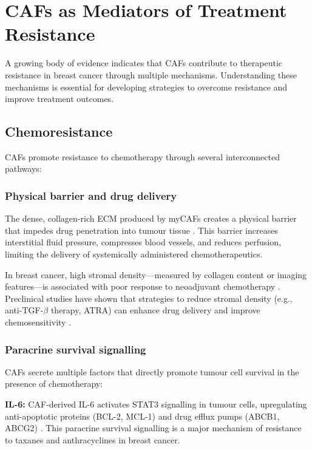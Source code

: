 \section{CAFs as Mediators of Treatment Resistance}
\label{sec:resistance}

A growing body of evidence indicates that CAFs contribute to therapeutic resistance in breast cancer through multiple mechanisms. Understanding these mechanisms is essential for developing strategies to overcome resistance and improve treatment outcomes.

\subsection{Chemoresistance}

CAFs promote resistance to chemotherapy through several interconnected pathways:

\subsubsection{Physical barrier and drug delivery}

The dense, collagen-rich ECM produced by myCAFs creates a physical barrier that impedes drug penetration into tumour tissue \citep{provenzano2012}. This barrier increases interstitial fluid pressure, compresses blood vessels, and reduces perfusion, limiting the delivery of systemically administered chemotherapeutics.

In breast cancer, high stromal density---measured by collagen content or imaging features---is associated with poor response to neoadjuvant chemotherapy \citep{farinha2019}. Preclinical studies have shown that strategies to reduce stromal density (e.g., anti-TGF-$\beta$ therapy, ATRA) can enhance drug delivery and improve chemosensitivity \citep{liu2023}.

\subsubsection{Paracrine survival signalling}

CAFs secrete multiple factors that directly promote tumour cell survival in the presence of chemotherapy:

\textbf{IL-6:} CAF-derived IL-6 activates STAT3 signalling in tumour cells, upregulating anti-apoptotic proteins (BCL-2, MCL-1) and drug efflux pumps (ABCB1, ABCG2) \citep{chang2014}. This paracrine survival signalling is a major mechanism of resistance to taxanes and anthracyclines in breast cancer.

